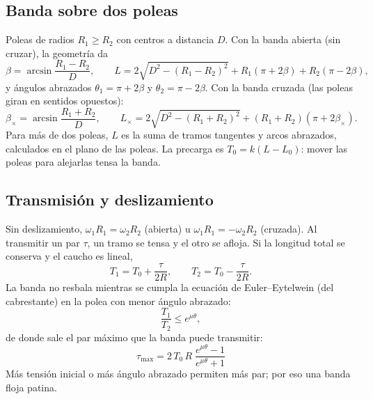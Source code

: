 \documentclass[11pt,a4paper]{article}
\numberwithin{equation}{section}
\begin{document}
\subsection{Banda sobre dos poleas}
Poleas de radios $R_1 \ge R_2$ con centros a distancia $D$. Con la banda abierta (sin cruzar), la geometría da
\begin{equation}
  \beta = \arcsin\frac{R_1 - R_2}{D}, \qquad
  L = 2\sqrt{D^2 - (R_1-R_2)^2} + R_1(\pi + 2\beta) + R_2(\pi - 2\beta),
\end{equation}
y ángulos abrazados $\theta_1 = \pi + 2\beta$ y $\theta_2 = \pi - 2\beta$. Con la banda cruzada (las poleas giran en
sentidos opuestos):
\begin{equation}
  \beta_\times = \arcsin\frac{R_1 + R_2}{D}, \qquad
  L_\times = 2\sqrt{D^2 - (R_1+R_2)^2} + (R_1 + R_2)(\pi + 2\beta_\times).
\end{equation}
Para más de dos poleas, $L$ es la suma de tramos tangentes y arcos abrazados, calculados en el plano de las poleas.
La precarga es $T_0 = k(L - L_0)$: mover las poleas para alejarlas tensa la banda.

\subsection{Transmisión y deslizamiento}
Sin deslizamiento, $\omega_1 R_1 = \omega_2 R_2$ (abierta) u $\omega_1 R_1 = -\omega_2 R_2$ (cruzada). Al transmitir un
par $\tau$, un tramo se tensa y el otro se afloja. Si la longitud total se conserva y el caucho es lineal,
\begin{equation}
  T_1 = T_0 + \frac{\tau}{2R}, \qquad T_2 = T_0 - \frac{\tau}{2R}.
\end{equation}
La banda no resbala mientras se cumpla la ecuación de Euler–Eytelwein (del cabrestante) en la polea con menor ángulo
abrazado:
\begin{equation}
  \frac{T_1}{T_2} \le e^{\mu\theta},
\end{equation}
de donde sale el par máximo que la banda puede transmitir:
\begin{equation}
  \boxed{\;\tau_{\max} = 2\,T_0\,R\;\frac{e^{\mu\theta}-1}{e^{\mu\theta}+1}\;}\label{eq:taumax}
\end{equation}
Más tensión inicial o más ángulo abrazado permiten más par; por eso una banda floja patina.
\end{document}
